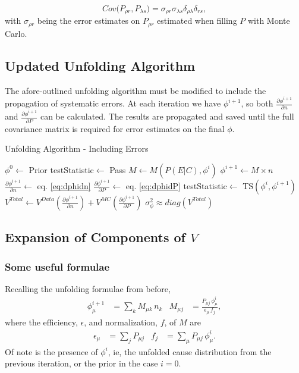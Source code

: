 \begin{equation} \label{eq:CovPPPoisson}
Cov \big( P_{\rho r}, P_{\lambda s} \big) =
   \sigma_{\rho r} \sigma_{\lambda s} \delta_{\rho \lambda} \delta_{rs},
\end{equation}
with $\sigma_{\rho r}$ being the error estimates on $P_{\rho r}$ estimated when filling $P$ with Monte Carlo.

\subsection{Updated Unfolding Algorithm}

The afore-outlined unfolding algorithm must be modified to include the propagation of systematic errors.
At each iteration we have $\phi^{i+1}$, so both $\frac{\partial \phi^{i+1}}{\partial n}$ and $\frac{\partial \phi^{i+1}}{\partial P}$
can be calculated. The results are propagated and saved until the full covariance matrix is required for error estimates on the final $\phi$.

\begin{algorithm}
  \caption{Unfolding Algorithm - Including Errors}
  \begin{algorithmic}
  	\State $\phi^{0}\gets$ Prior
	\State testStatistic$\gets$ Pass
		\State $M\gets M(P(E|C),\phi^{i})$
		\State $\phi^{i+1}\gets M \times n$
		\State $\frac{\partial \phi^{i+1}}{\partial n}\gets$ eq. \ref{eq:dphidn}
		\State $\frac{\partial \phi^{i+1}}{\partial P}\gets$ eq. \ref{eq:dphidP}
		\State testStatistic$\gets$ TS$(\phi^{i},\phi^{i+1})$
	\EndWhile
	\State $V^{Total}\gets V^{Data}(\frac{\partial \phi^{i+1}}{\partial n})+V^{MC}(\frac{\partial \phi^{i+1}}{\partial P})$
	\State $\sigma^{2}_{\phi} \approx diag(V^{Total})$
  \end{algorithmic}
\end{algorithm}


\subsection{Expansion of Components of $V$}\label{adye_full_derivation}

\subsubsection{Some useful formulae}
Recalling the unfolding formulae from before,
\begin{align*}
	\phi^{i+1}_{\mu} &= \sum_{k}{M_{\mu k} \, n_{k}}
	&
	M_{\mu j} &= \frac{ P_{\mu j} \, \phi^{i}_{\mu} }{ \epsilon_{\mu} \, f_{j}},
\end{align*}
where the efficiency, $\epsilon$, and normalization, $f$, of $M$ are
\begin{align*} %
	\epsilon_{\mu} &= \sum_{j} {P_{\mu j}}
	&
	f_{j} &= \sum_{\mu}{P_{\mu j} \, \phi^{i}_{\mu}}.
\end{align*}
Of note is the presence of $\phi^{i}$, ie, the unfolded cause distribution from the previous iteration, or the 
prior in the case $i=0$.

